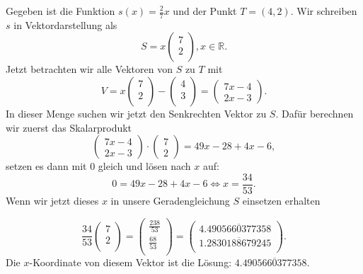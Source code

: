 \documentclass{article}
\begin{document}
Gegeben ist die Funktion \(s(x)=\frac27x\) und der Punkt \(T=(4, 2)\).
Wir schreiben \(s\) in Vektordarstellung als \[S=x\begin{pmatrix}7\\2\\\end{pmatrix}, x\in \mathbb{R}.\]
Jetzt betrachten wir alle Vektoren von \(S\) zu \(T\) mit
\[V=x\begin{pmatrix}7\\2\\\end{pmatrix} - \begin{pmatrix}4\\3\\\end{pmatrix}=
\begin{pmatrix}7x-4\\2x-3\end{pmatrix}.\] In dieser Menge suchen wir jetzt den Senkrechten Vektor
zu \(S\). Dafür berechnen wir zuerst das Skalarprodukt
\[\begin{pmatrix}7x-4\\2x-3\end{pmatrix}\cdot\begin{pmatrix}7\\2\end{pmatrix}=49x-28+4x-6,\] setzen 
es dann mit \(0\) gleich und lösen nach \(x\) auf:
\[0=49x-28+4x-6\Leftrightarrow x=\frac{34}{53}.\]
Wenn wir jetzt dieses \(x\) in unsere Geradengleichung \(S\) einsetzen erhalten

\[\frac{34}{53}\begin{pmatrix}7\\2\\\end{pmatrix}=
\begin{pmatrix}\frac{238}{53}\\\frac{68}{53}\\\end{pmatrix}=
\begin{pmatrix}4.\overline{4905660377358}\\1.\overline{2830188679245}\\\end{pmatrix}
.\]
Die \(x\)-Koordinate von diesem Vektor ist die Lösung: \(4.\overline{4905660377358}\).
\end{document}
